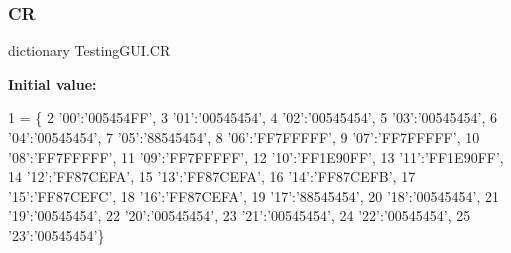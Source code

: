 \mbox{\label{namespaceTestingGUI_af38d10d3b8204ffbe61a4ec28c035776}} 
\subsubsection{\texorpdfstring{CR}{CR}}
{\footnotesize\ttfamily dictionary Testing\+G\+U\+I.\+CR}

{\bfseries Initial value\+:}
\begin{DoxyCode}
1 =  \{
2 \textcolor{stringliteral}{'00'}:\textcolor{stringliteral}{'005454FF'},
3 \textcolor{stringliteral}{'01'}:\textcolor{stringliteral}{'00545454'},
4 \textcolor{stringliteral}{'02'}:\textcolor{stringliteral}{'00545454'},
5 \textcolor{stringliteral}{'03'}:\textcolor{stringliteral}{'00545454'},
6 \textcolor{stringliteral}{'04'}:\textcolor{stringliteral}{'00545454'},
7 \textcolor{stringliteral}{'05'}:\textcolor{stringliteral}{'88545454'},
8 \textcolor{stringliteral}{'06'}:\textcolor{stringliteral}{'FF7FFFFF'},
9 \textcolor{stringliteral}{'07'}:\textcolor{stringliteral}{'FF7FFFFF'},
10 \textcolor{stringliteral}{'08'}:\textcolor{stringliteral}{'FF7FFFFF'},
11 \textcolor{stringliteral}{'09'}:\textcolor{stringliteral}{'FF7FFFFF'},
12 \textcolor{stringliteral}{'10'}:\textcolor{stringliteral}{'FF1E90FF'},
13 \textcolor{stringliteral}{'11'}:\textcolor{stringliteral}{'FF1E90FF'},
14 \textcolor{stringliteral}{'12'}:\textcolor{stringliteral}{'FF87CEFA'},
15 \textcolor{stringliteral}{'13'}:\textcolor{stringliteral}{'FF87CEFA'},
16 \textcolor{stringliteral}{'14'}:\textcolor{stringliteral}{'FF87CEFB'},
17 \textcolor{stringliteral}{'15'}:\textcolor{stringliteral}{'FF87CEFC'},
18 \textcolor{stringliteral}{'16'}:\textcolor{stringliteral}{'FF87CEFA'},
19 \textcolor{stringliteral}{'17'}:\textcolor{stringliteral}{'88545454'},
20 \textcolor{stringliteral}{'18'}:\textcolor{stringliteral}{'00545454'},
21 \textcolor{stringliteral}{'19'}:\textcolor{stringliteral}{'00545454'},
22 \textcolor{stringliteral}{'20'}:\textcolor{stringliteral}{'00545454'},
23 \textcolor{stringliteral}{'21'}:\textcolor{stringliteral}{'00545454'},
24 \textcolor{stringliteral}{'22'}:\textcolor{stringliteral}{'00545454'},
25 \textcolor{stringliteral}{'23'}:\textcolor{stringliteral}{'00545454'}\}
\end{DoxyCode}
\mbox{\label{namespaceTestingGUI_a5a1fe398b7a7e172a18aa44b2c1793f4}} 
